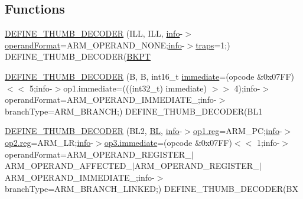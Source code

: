 \subsection*{Functions}
\begin{DoxyCompactItemize}
\item 
\mbox{\hyperlink{decoder-thumb_8c_a9fe7536ba50beb695d49424cac158ce2}{D\+E\+F\+I\+N\+E\+\_\+\+T\+H\+U\+M\+B\+\_\+\+D\+E\+C\+O\+D\+ER}} (I\+LL, I\+LL, \mbox{\hyperlink{libretro_8h_a283ad41e4809f9c0ebe736a9861d8a91}{info}}-\/$>$\mbox{\hyperlink{decoder-thumb_8c_a52313e50f86644324806d9228ecd8472}{operand\+Format}}=A\+R\+M\+\_\+\+O\+P\+E\+R\+A\+N\+D\+\_\+\+N\+O\+NE;\mbox{\hyperlink{libretro_8h_a283ad41e4809f9c0ebe736a9861d8a91}{info}}-\/$>$\mbox{\hyperlink{decoder-thumb_8c_afe08430c255629bed908d9bf22397277}{traps}}=1;) D\+E\+F\+I\+N\+E\+\_\+\+T\+H\+U\+M\+B\+\_\+\+D\+E\+C\+O\+D\+ER(\mbox{\hyperlink{decoder-thumb_8c_ada39db97dab5656c737ecdd20e83feca}{B\+K\+PT}}
\item 
\mbox{\hyperlink{decoder-thumb_8c_a42454ef7653cfa456b11730984ac1240}{D\+E\+F\+I\+N\+E\+\_\+\+T\+H\+U\+M\+B\+\_\+\+D\+E\+C\+O\+D\+ER}} (B, B, int16\+\_\+t \mbox{\hyperlink{lr35902_2decoder_8c_a8bc2501cb64b3bc9ac59754cfafb68d1}{immediate}}=(opcode \&0x07\+F\+F)$<$$<$ 5;info-\/$>$op1.\+immediate=(((int32\+\_\+t) immediate) $>$$>$ 4);info-\/$>$operand\+Format=\+A\+R\+M\+\_\+\+O\+P\+E\+R\+A\+N\+D\+\_\+\+I\+M\+M\+E\+D\+I\+A\+T\+E\+\_;info-\/$>$branch\+Type=\+A\+R\+M\+\_\+\+B\+R\+A\+N\+C\+H;) D\+E\+F\+I\+N\+E\+\_\+\+T\+H\+U\+M\+B\+\_\+\+D\+E\+C\+O\+D\+E\+R(\+B\+L1
\item 
\mbox{\hyperlink{decoder-thumb_8c_a284c2fa9f44b059ad6e22da7522fa512}{D\+E\+F\+I\+N\+E\+\_\+\+T\+H\+U\+M\+B\+\_\+\+D\+E\+C\+O\+D\+ER}} (B\+L2, \mbox{\hyperlink{decoder-thumb_8c_adafdf5f045e21581219028370836474d}{BL}}, \mbox{\hyperlink{libretro_8h_a283ad41e4809f9c0ebe736a9861d8a91}{info}}-\/$>$\mbox{\hyperlink{lr35902_2decoder_8c_af44c02f7785479603f59b662f3dfae6a}{op1.\+reg}}=A\+R\+M\+\_\+\+PC;\mbox{\hyperlink{libretro_8h_a283ad41e4809f9c0ebe736a9861d8a91}{info}}-\/$>$\mbox{\hyperlink{lr35902_2decoder_8c_af44c02f7785479603f59b662f3dfae6a}{op2.\+reg}}=A\+R\+M\+\_\+\+LR;\mbox{\hyperlink{libretro_8h_a283ad41e4809f9c0ebe736a9861d8a91}{info}}-\/$>$\mbox{\hyperlink{lr35902_2decoder_8c_a8bc2501cb64b3bc9ac59754cfafb68d1}{op3.\+immediate}}=(opcode \&0x07\+F\+F)$<$$<$ 1;info-\/$>$operand\+Format=\+A\+R\+M\+\_\+\+O\+P\+E\+R\+A\+N\+D\+\_\+\+R\+E\+G\+I\+S\+T\+E\+R\+\_$\vert$\+A\+R\+M\+\_\+\+O\+P\+E\+R\+A\+N\+D\+\_\+\+A\+F\+F\+E\+C\+T\+E\+D\+\_$\vert$\+A\+R\+M\+\_\+\+O\+P\+E\+R\+A\+N\+D\+\_\+\+R\+E\+G\+I\+S\+T\+E\+R\+\_$\vert$\+A\+R\+M\+\_\+\+O\+P\+E\+R\+A\+N\+D\+\_\+\+I\+M\+M\+E\+D\+I\+A\+T\+E\+\_;info-\/$>$branch\+Type=\+A\+R\+M\+\_\+\+B\+R\+A\+N\+C\+H\+\_\+\+L\+I\+N\+K\+E\+D;) D\+E\+F\+I\+N\+E\+\_\+\+T\+H\+U\+M\+B\+\_\+\+D\+E\+C\+O\+D\+E\+R(\+BX
$$
\end{DoxyCompactItemize}
